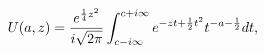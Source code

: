 \[\mathop{U\/}\nolimits\!\left(a,z\right)=\frac{e^{\frac{1}{4}z^{2}}}{i\sqrt{2%
\pi}}\int_{c-i\infty}^{c+i\infty}e^{-zt+\frac{1}{2}t^{2}}t^{-a-\frac{1}{2}}dt,\]